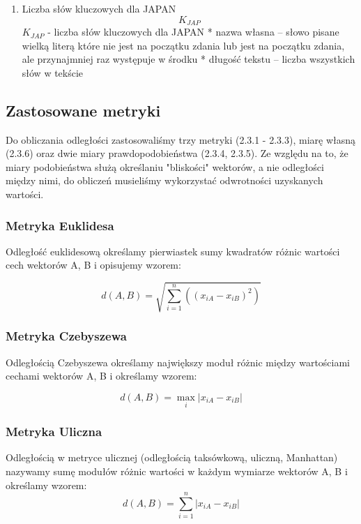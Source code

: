 \documentclass{classrep}
\begin{document}
\begin{enumerate}
  
  \item Liczba słów kluczowych dla JAPAN
  \newline
  \begin{equation}
  	K_{JAP}
  \end{equation}
  \newline \quad $K_{JAP}$ - liczba słów kluczowych dla JAPAN
  \newline \newline
  * nazwa własna – słowo pisane wielką literą które nie jest na początku zdania lub jest na początku zdania, ale przynajmniej raz występuje w środku\newline
* długość tekstu – liczba wszystkich słów w tekście
\end{enumerate}

\subsection{Zastosowane metryki}
Do obliczania odległości zastosowaliśmy trzy metryki (2.3.1 - 2.3.3), miarę własną (2.3.6) oraz dwie miary prawdopodobieństwa (2.3.4, 2.3.5). Ze względu na to, że miary podobieństwa służą określaniu "bliskości" wektorów, a nie odległości między nimi, do obliczeń musieliśmy wykorzystać odwrotności uzyskanych wartości. 
\subsubsection{Metryka Euklidesa}
Odległość euklidesową określamy pierwiastek sumy kwadratów różnic wartości cech wektorów A, B i opisujemy wzorem:

\begin{equation}
d(A, B) =  \sqrt{\sum_{i=1}^n((x_{iA} - x_{iB})^2)}
\end{equation}

\subsubsection{Metryka Czebyszewa}
Odległością Czebyszewa określamy największy moduł różnic między wartościami cechami wektorów A, B i określamy wzorem:

\begin{equation}
d(A, B) =  \mathop{max}_{i}|x_{iA} - x_{iB}|
\end{equation}

\subsubsection{Metryka Uliczna}
Odległością w metryce ulicznej (odległością taksówkową, uliczną, Manhattan) nazywamy sumę modułów różnic wartości w każdym wymiarze wektorów A, B i określamy wzorem:
\begin{equation}
d(A, B) =  \sum_{i=1}^n|x_{iA} - x_{iB}|
\end{equation}
\end{document}
